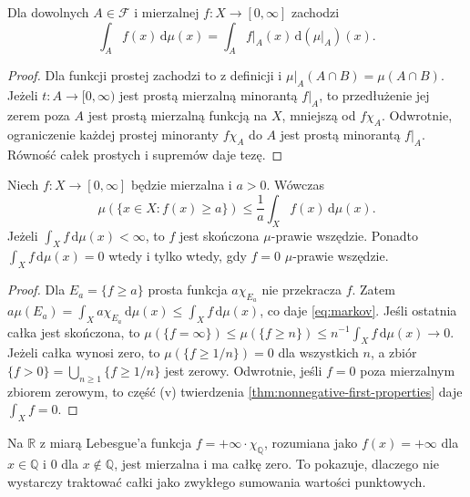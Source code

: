 \begin{lemat}
\label{lem:restriction-integral}
Dla dowolnych $A\in\mathcal F$ i mierzalnej
$f:X\to[0,\infty]$ zachodzi
\[
\int_A f(x)\,\mathrm d\mu(x)
=\int_A f|_A(x)\,\mathrm d(\mu|_A)(x).
\]
\end{lemat}
\begin{proof}
Dla funkcji prostej zachodzi to z definicji i
$\mu|_A(A\cap B)=\mu(A\cap B)$.
Jeżeli $t:A\to[0,\infty)$ jest prostą mierzalną
minorantą $f|_A$, to przedłużenie jej zerem poza $A$
jest prostą mierzalną funkcją na $X$, mniejszą od
$f\chi_A$. Odwrotnie, ograniczenie każdej
prostej minoranty $f\chi_A$ do $A$ jest
prostą minorantą $f|_A$. Równość całek prostych
i supremów daje tezę.
\end{proof}

\begin{twierdzenie}
\label{thm:markov-nonnegative}
Niech $f:X\to[0,\infty]$ będzie mierzalna i $a>0$.
Wówczas
\begin{equation}\label{eq:markov}
\mu(\{x\in X:f(x)\ge a\})
\le \frac1a\int_X f(x)\,\mathrm d\mu(x).
\end{equation}
Jeżeli $\int_Xf\,\mathrm d\mu(x)<\infty$, to $f$ jest
skończona $\mu$-prawie wszędzie. Ponadto
$\int_Xf\,\mathrm d\mu(x)=0$ wtedy i tylko wtedy,
gdy $f=0$ $\mu$-prawie wszędzie.
\end{twierdzenie}
\begin{proof}
Dla $E_a=\{f\ge a\}$ prosta funkcja
$a\chi_{E_a}$ nie przekracza $f$. Zatem
$a\mu(E_a)=\int_X a\chi_{E_a}\,\mathrm d\mu(x)
\le\int_Xf\,\mathrm d\mu(x)$, co daje
\eqref{eq:markov}. Jeśli ostatnia całka jest skończona,
to $\mu(\{f=\infty\})\le\mu(\{f\ge n\})
\le n^{-1}\int_Xf\,\mathrm d\mu(x)\to0$.
Jeżeli całka wynosi zero, to
$\mu(\{f\ge 1/n\})=0$ dla wszystkich $n$, a zbiór
$\{f>0\}=\bigcup_{n\ge1}\{f\ge1/n\}$ jest zerowy.
Odwrotnie, jeśli $f=0$ poza mierzalnym zbiorem zerowym,
to część (v) twierdzenia
\ref{thm:nonnegative-first-properties} daje $\int_X f=0$.
\end{proof}

\begin{przyklad}
Na $\mathbb R$ z miarą Lebesgue'a funkcja
$f=+\infty\cdot\chi_{\mathbb Q}$, rozumiana jako
$f(x)=+\infty$ dla $x\in\mathbb Q$ i $0$ dla
$x\notin\mathbb Q$, jest mierzalna i ma całkę zero.
To pokazuje, dlaczego nie wystarczy traktować
całki jako zwykłego sumowania wartości punktowych.
\end{przyklad}

